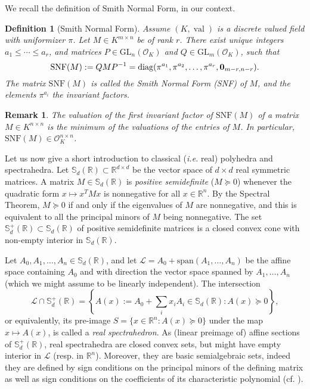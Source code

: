 \documentclass[a4paper,oneside,10pt]{article}
\newtheorem{definition}[theorem]{Definition}
\newtheorem{remark}[theorem]{Remark}
\newcommand{\R}{\mathbb{R}} %
\newcommand{\sym}{\mathbb{S}} %
\renewcommand{\span}[1]{{\text{span}(#1)}} %
\newcommand{\calL}{\mathcal{L}} %
\DeclareMathOperator{\val}{val}
\newcommand{\OK}{\mathcal{O}_K}
\def\diag{\mathrm{diag}}
\newcommand{\GL}{\mathrm{GL}}
\begin{document}
We recall the definition of Smith Normal Form, in our context.
\begin{definition}[Smith Normal Form]\label{smith_nf}
  Assume $(K,\val)$ is a discrete valued field with uniformizer $\pi$.
  Let $M \in K^{m \times n}$ be of rank $r$. There exist unique integers
  $a_1 \leq \cdots \leq a_r$, and
  matrices $P \in \GL_n(\OK)$ and $Q \in \GL_m(\OK)$, such that
  $$
  \mathrm{SNF}(M) := QMP^{-1} = \diag(\pi^{a_1}, \pi^{a_2}, \ldots, \pi^{a_r}, {\bf 0}_{m-r,n-r}).
  $$
  The matrix $\mathrm{SNF}(M)$ is called the \emph{Smith Normal Form (SNF)} of $M$, and the elements $\pi^{a_i}$ the
  \emph{invariant factors}.
\end{definition}
\begin{remark}
  The valuation of the first invariant factor of $\mathrm{SNF}(M)$ of a matrix
  $M \in K^{n \times n}$ is the minimum of the valuations of the entries of
  $M$. In particular, $\mathrm{SNF}(M) \in \OK^{n \times n}$.
\end{remark}

Let us now give a short introduction to classical ({\it i.e.} real) polyhedra and spectrahedra.
Let $\sym_d(\R) \subset \R^{d\times d}$ be the vector space of $d \times d$ real symmetric
matrices. A matrix $M \in \sym_d(\R)$ is \emph{positive semidefinite} ($M \succeq 0$) whenever the quadratic form $x \mapsto x^TMx$ is nonnegative for all $x\in \R^n$. By the Spectral Theorem, $M \succeq 0$ if and only if the eigenvalues of $M$ are nonnegative, and this is equivalent to all the principal minors of $M$ being nonnegative. The set $\sym_d^+(\R) \subset \sym_d(\R)$ of positive semidefinite matrices is a closed convex cone with non-empty interior in $\sym_d(\R)$.

Let $A_0,A_1,\ldots,A_n \in \sym_d(\R)$, and let $\calL = A_0+\span{A_1,\ldots,A_n}$ be the affine space
containing $A_0$ and with direction the vector space spanned by $A_1,\ldots,A_n$ (which we might assume
to be linearly independent). The intersection
$$
\calL \cap \sym_d^+(\R) = \left\{A(x) := A_0+\sum_i x_i A_i \in \sym_d(\R) :
A(x) \succeq 0\right\},
$$
or equivalently, its pre-image $S = \{x \in \R^n : A(x) \succeq 0\}$ under the map $x \mapsto A(x)$, is called
a \emph{real spectrahedron}. As (linear preimage of) affine sections of $\sym_d^+(\R)$, real spectrahedra
are closed convex sets, but might have empty interior in $\calL$ (resp. in $\R^n$).
Moreover, they are basic semialgebraic sets, indeed they are defined by sign conditions on the principal
minors of the defining matrix as well as sign conditions on the coefficients of its characteristic polynomial
(cf. ).
\end{document}

